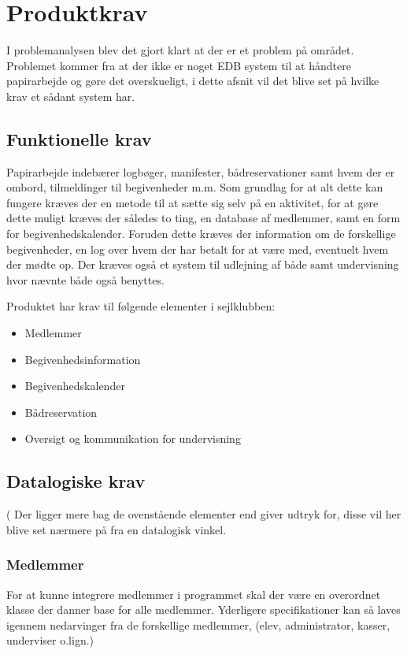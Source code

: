 \chapter{Produktkrav}
I problemanalysen blev det gjort klart at der er et problem på området. Problemet kommer fra at der ikke er noget EDB
system til at håndtere papirarbejde og gøre det overskueligt, i dette afsnit vil det blive set på hvilke krav et sådant
system har.

\section{Funktionelle krav} \label{sec:funktionelleKrav}
Papirarbejde indebærer logbøger, manifester, bådreservationer samt hvem der er ombord, tilmeldinger til begivenheder m.m.
Som grundlag for at alt dette kan fungere kræves der en metode til at sætte sig selv på en aktivitet, for at gøre dette
muligt kræves der således to ting, en database af medlemmer, samt en form for begivenhedskalender. Foruden dette kræves
der information om de forskellige begivenheder, en log over hvem der har betalt for at være med, eventuelt hvem der
mødte op. Der kræves også et system til udlejning af både samt undervisning hvor nævnte både også benyttes.

Produktet har krav til følgende elementer i sejlklubben:
\begin{itemize}
  \item Medlemmer
  \item Begivenhedsinformation
  \item Begivenhedskalender
  \item Bådreservation
  \item Oversigt og kommunikation for undervisning
\end{itemize}

\section{Datalogiske krav}(
Der ligger mere bag de ovenstående elementer end  giver udtryk for, disse vil her blive set nærmere på fra en datalogisk vinkel.
\subsection{Medlemmer}
For at kunne integrere medlemmer i programmet skal der være en overordnet klasse der danner base for alle medlemmer. Yderligere specifikationer kan så laves igennem nedarvinger fra de forskellige medlemmer, (elev, administrator, kasser, underviser o.lign.)
